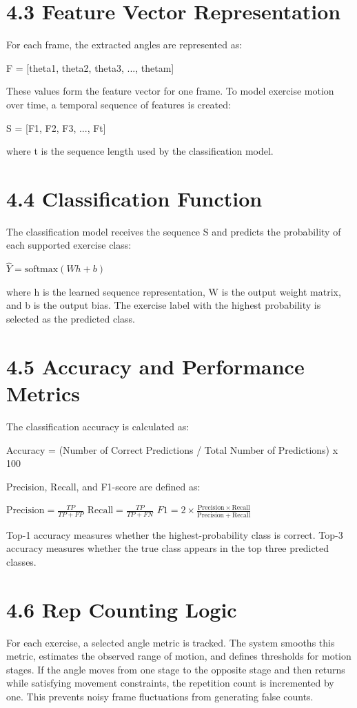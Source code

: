 \documentclass[12pt,a4paper]{report}
\begin{document}
\section{4.3 Feature Vector Representation}
For each frame, the extracted angles are represented as:

F = [theta1, theta2, theta3, ..., thetam]

These values form the feature vector for one frame. To model exercise motion over time, a temporal sequence of features is created:

S = [F1, F2, F3, ..., Ft]

where t is the sequence length used by the classification model.

\section{4.4 Classification Function}
The classification model receives the sequence S and predicts the probability of each supported exercise class:

$\hat{Y} = \mathrm{softmax}(W h + b)$

where h is the learned sequence representation, W is the output weight matrix, and b is the output bias. The exercise label with the highest probability is selected as the predicted class.

\section{4.5 Accuracy and Performance Metrics}
The classification accuracy is calculated as:

Accuracy = (Number of Correct Predictions / Total Number of Predictions) x 100

Precision, Recall, and F1-score are defined as:

$\mathrm{Precision} = \frac{TP}{TP+FP}$
$\mathrm{Recall} = \frac{TP}{TP+FN}$
$F1 = 2 \times \frac{\mathrm{Precision} \times \mathrm{Recall}}{\mathrm{Precision}+\mathrm{Recall}}$

Top-1 accuracy measures whether the highest-probability class is correct.  
Top-3 accuracy measures whether the true class appears in the top three predicted classes.

\section{4.6 Rep Counting Logic}
For each exercise, a selected angle metric is tracked. The system smooths this metric, estimates the observed range of motion, and defines thresholds for motion stages. If the angle moves from one stage to the opposite stage and then returns while satisfying movement constraints, the repetition count is incremented by one. This prevents noisy frame fluctuations from generating false counts.
\end{document}
